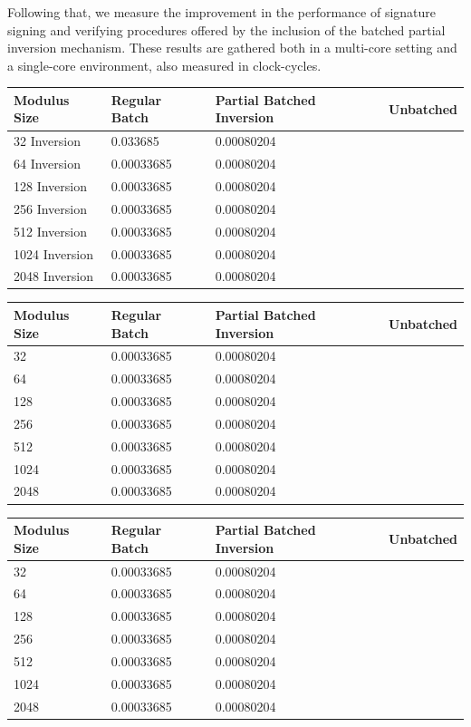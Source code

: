 Following that, we measure the improvement in the performance of signature signing and verifying procedures offered by the inclusion of the batched partial inversion mechanism. These results are gathered both in a multi-core setting and a single-core environment, also measured in clock-cycles.  


\begin{center}
\begin{tabular}{@{}llll@{}}
	\toprule
	Modulus Size & Regular Batch & Partial Batched Inversion & Unbatched \\
	\midrule
	32 Inversion & 0.033685 & 0.00080204\\
	64 Inversion & 0.00033685 & 0.00080204\\
	128 Inversion & 0.00033685 & 0.00080204\\
	256 Inversion & 0.00033685 & 0.00080204\\
	512 Inversion & 0.00033685 & 0.00080204\\
	1024 Inversion & 0.00033685 & 0.00080204\\
	2048 Inversion & 0.00033685 & 0.00080204\\
	\bottomrule
\end{tabular}
\end{center}

\begin{center}
\begin{tabular}{@{}llll@{}}
	\toprule
	Modulus Size & Regular Batch & Partial Batched Inversion & Unbatched \\
	\midrule
	32 & 0.00033685 & 0.00080204\\
	64 & 0.00033685 & 0.00080204\\
	128 & 0.00033685 & 0.00080204\\
	256 & 0.00033685 & 0.00080204\\
	512 & 0.00033685 & 0.00080204\\
	1024 & 0.00033685 & 0.00080204\\
	2048 & 0.00033685 & 0.00080204\\
	\bottomrule
\end{tabular}
\end{center}

\begin{center}
\begin{tabular}{@{}llll@{}}
	\toprule
	Modulus Size & Regular Batch & Partial Batched Inversion & Unbatched \\
	\midrule
	32 & 0.00033685 & 0.00080204\\
	64 & 0.00033685 & 0.00080204\\
	128 & 0.00033685 & 0.00080204\\
	256 & 0.00033685 & 0.00080204\\
	512 & 0.00033685 & 0.00080204\\
	1024 & 0.00033685 & 0.00080204\\
	2048 & 0.00033685 & 0.00080204\\
	\bottomrule
\end{tabular}
\end{center}

